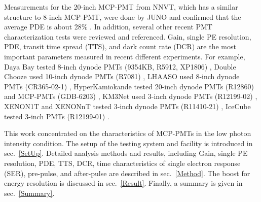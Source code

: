 Measurements for the 20-inch MCP-PMT from NNVT, which has a similar structure to 8-inch MCP-PMT, were done by JUNO and confirmed that the average PDE is about 28\% \cite{JUNOMassTesting}. In addition, several other recent PMT characterization tests were reviewed and referenced. Gain, single PE resolution, PDE, transit time spread (TTS), and dark count rate (DCR) are the most important parameters measured in recent different experiments. For example, Daya Bay tested 8-inch dynode PMTs (9354KB, R5912, XP1806) \cite{DayaBayTesting}, Double Chooze used 10-inch dynode PMTs (R7081) \cite{DoubleChoozeTesting}, LHAASO used 8-inch dynode PMTs (CR365-02-1) \cite{LHAASOTesting}, HyperKamiokande tested 20-inch dynode PMTs (R12860) and MCP-PMTs (GDB-6203) \cite{HyperKTesting}, KM3Net used 3-inch dynode PMTs (R12199-02) \cite{KM3NetTesting}, XENON1T and XENONnT tested 3-inch dynode PMTs (R11410-21) \cite{XENON1TTesting}\cite{XENONnTTesting}, IceCube tested 3-inch PMTs (R12199-01) \cite{IceCubeTesting}.

This work concentrated on the characteristics of MCP-PMTs in the low photon intensity condition. The setup of the testing system and facility is introduced in sec.~\ref{SetUp}. Detailed analysis methods and results, including Gain, single PE resolution, PDE, TTS, DCR, time characteristics of single electron response (SER), pre-pulse, and after-pulse are described in sec.~\ref{Method}. The boost for energy resolution is discussed in sec.~\ref{Result}. Finally, a summary is given in sec.~\ref{Summary}.
